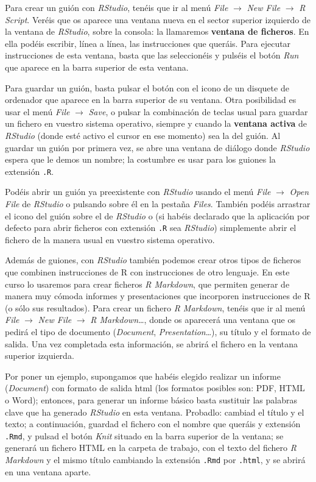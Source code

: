 \documentclass[]{book}
\theoremstyle{definition}
\theoremstyle{definition}
\theoremstyle{definition}
\theoremstyle{remark}
\begin{document}
Para crear un guión con \emph{RStudio}, tenéis que ir al menú \emph{File} \(\rightarrow\) \emph{New File} \(\rightarrow\) \emph{R Script}. Veréis que os aparece una ventana nueva en el sector superior izquierdo de la ventana de \emph{RStudio}, sobre la consola: la llamaremos \textbf{ventana de ficheros}. En ella podéis escribir, línea a línea, las instrucciones que queráis. Para ejecutar instrucciones de esta ventana, basta que las seleccionéis y pulséis el botón \emph{Run} que aparece en la barra superior de esta ventana.

Para guardar un guión, basta pulsar el botón con el icono de un disquete de ordenador que aparece en la barra superior de su ventana. Otra posibilidad es usar el menú \emph{File} \(\rightarrow\) \emph{Save}, o pulsar la combinación de teclas usual para guardar un fichero en vuestro sistema operativo, siempre y cuando la \textbf{ventana activa} de \emph{RStudio} (donde esté activo el cursor en ese momento) sea la del guión. Al guardar un guión por primera vez, se abre una ventana de diálogo donde \emph{RStudio} espera que le demos un nombre; la costumbre es usar para los guiones la extensión \texttt{.R}.

Podéis abrir un guión ya preexistente con \emph{RStudio} usando el menú \emph{File} \(\rightarrow\) \emph{Open File} de \emph{RStudio} o pulsando sobre él en la pestaña \emph{Files}. También podéis arrastrar el icono del guión sobre el de \emph{RStudio} o (si habéis declarado que la aplicación por defecto para abrir ficheros con extensión \texttt{.R} sea \emph{RStudio}) simplemente abrir el fichero de la manera usual en vuestro sistema operativo.

Además de guiones, con \emph{RStudio} también podemos crear otros tipos de ficheros que combinen instrucciones de R con instrucciones de otro lenguaje. En este curso lo usaremos para crear ficheros \emph{R Markdown}, que permiten generar de manera muy cómoda informes y presentaciones que incorporen instrucciones de R (o sólo sus resultados). Para crear un fichero \emph{R Markdown}, tenéis que ir al menú \emph{File} \(\rightarrow\) \emph{New File} \(\rightarrow\) \emph{R Markdown\ldots{}}, donde os aparecerá una ventana que os pedirá el tipo de documento (\emph{Document}, \emph{Presentation}\ldots{}), su título y el formato de salida. Una vez completada esta información, se abrirá el fichero en la ventana superior izquierda.

Por poner un ejemplo, supongamos que habéis elegido realizar un informe (\emph{Document}) con formato de salida html (los formatos posibles son: PDF, HTML o Word); entonces, para generar un informe básico basta sustituir las palabras clave que ha generado \emph{RStudio} en esta ventana. Probadlo: cambiad el título y el texto; a continuación, guardad el fichero con el nombre que queráis y extensión \texttt{.Rmd}, y pulsad el botón \emph{Knit} situado en la barra superior de la ventana; se generará un fichero HTML en la carpeta de trabajo, con el texto del fichero \emph{R Markdown} y el mismo título cambiando la extensión \texttt{.Rmd} por \texttt{.html}, y se abrirá en una ventana aparte.
\end{document}
